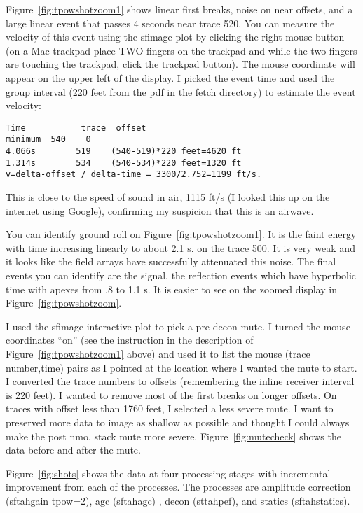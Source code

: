 Figure~\ref{fig:tpowshotzoom1} shows linear first breaks, noise on near offsets, and a large linear event that passes 4 seconds near trace 520.  You can measure the velocity of this event using the sfimage plot by clicking the right mouse button (on a Mac trackpad place TWO fingers on the trackpad and while the two fingers are touching the trackpad, click the trackpad button).  The mouse coordinate will appear on the upper left of the display.  I picked the event time and used the group interval (220 feet from the pdf in the fetch directory) to estimate the event velocity:

\begin{verbatim}  
Time           trace  offset
minimum  540    0
4.066s        519    (540-519)*220 feet=4620 ft
1.314s        534    (540-534)*220 feet=1320 ft
v=delta-offset / delta-time = 3300/2.752=1199 ft/s.
\end{verbatim}  

This is close to the speed of sound in air, 1115 ft/s (I looked this up on the internet using Google), confirming my suspicion that this is an airwave.   

You can identify ground roll on Figure~\ref{fig:tpowshotzoom1}.  It is the faint energy with time increasing linearly to about 2.1 s. on the trace 500.  It is very weak and it looks like the field arrays have successfully attenuated this noise.  The final events you can identify are the signal, the reflection events which have hyperbolic time with apexes from .8 to 1.1 s.  It is easier to see on the zoomed display in Figure~\ref{fig:tpowshotzoom}.

I used the sfimage interactive plot to pick a pre decon mute.  I turned the mouse coordinates “on” (see the instruction in the description of Figure~\ref{fig:tpowshotzoom1} above) and used it to list the mouse (trace number,time) pairs as I pointed at the location where I wanted the mute to start.  I converted the trace numbers to offsets (remembering the inline receiver interval is 220 feet).  I wanted to remove most of the first breaks on longer offsets.  On traces with offset less than 1760 feet, I selected a less severe mute.  I want to preserved more data to image as shallow as possible and thought I could always make the post nmo, stack mute more severe.  Figure~\ref{fig:mutecheck} shows the data before and after the mute.

Figure~\ref{fig:shots} shows the data at four processing stages with incremental improvement from each of the processes.  The processes are amplitude correction (sftahgain tpow=2), agc (sftahagc) , decon (sttahpef), and statics (sftahstatics).

